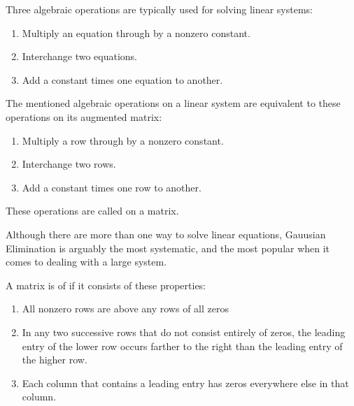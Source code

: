     \par Three algebraic operations are typically used for solving
      linear systems:

    \begin{enumerate}
      \item Multiply an equation through by a nonzero constant.
      \item Interchange two equations.
      \item Add a constant times one equation to another.
    \end{enumerate}

    \par The mentioned algebraic operations on a linear system are 
    equivalent to these operations on its augmented matrix:

    \begin{enumerate}
      \item Multiply a row through by a nonzero constant.
      \item Interchange two rows.
      \item Add a constant times one row to another.
    \end{enumerate}

    \par These operations are called  on a
      matrix.



    \par Although there are more than one way to solve linear equations,
      Gauusian Elimination is arguably the most systematic, and the
      most popular when it comes to dealing with a large system.

    \par A matrix is of  if it consists of these
    properties:

    \begin{enumerate}
      \item All nonzero rows are above any rows of all zeros
      \item In any two successive rows that do not consist entirely of
        zeros, the leading entry of the lower row occurs farther to the right
        than the leading entry of the higher row.
      \item Each column that contains a leading entry has zeros everywhere
        else in that column.
    \end{enumerate}

